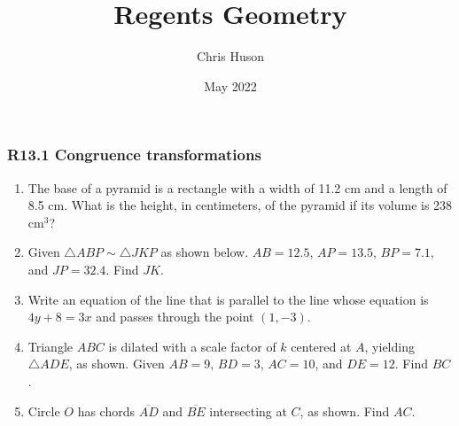 \documentclass[12pt, oneside]{article}
\title{Regents Geometry}
\author{Chris Huson}
\date{May 2022}
\begin{document}
\subsubsection*{R13.1 Congruence transformations}
\begin{enumerate}[itemsep=1.2cm]
\item The base of a pyramid is a rectangle with a width of 11.2 cm and a length of 8.5 cm. What is the height, in centimeters, of the pyramid if its volume is 238 cm$^3$?

\item Given $\triangle ABP \sim \triangle JKP$ as shown below. $AB=12.5$, $AP=13.5$, $BP=7.1$, and $JP=32.4$. Find $JK$.
  \begin{flushright}
    \end{flushright}

\item Write an equation of the line that is parallel to the line whose equation is $4y+8=3x$ and passes through the point $(1,-3)$.

\item Triangle $ABC$ is dilated with a scale factor of $k$ centered at $A$, yielding $\triangle ADE$, as shown. Given $AB=9$, $BD=3$, $AC=10$, and $DE=12$. Find $BC$.
\begin{center}
\end{center}

\newpage
\item Circle $O$ has chords $\overline{AD}$ and $\overline{BE}$ intersecting at $C$, as shown. Find $AC$.
\begin{center}
\end{center}


\end{enumerate}
\end{document}
